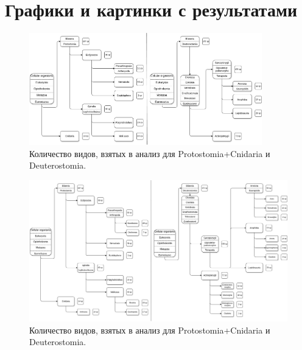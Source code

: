 \newpage
\section{Графики и картинки с результатами}

\begin{figure}[h] %
    \centering
    \includegraphics[width=0.9\textwidth]{images/Tree_summary}
    \caption{Количество видов, взятых в анализ для Protostomia+Cnidaria и Deuterostomia.}
    \label{fig:tree_1}
\end{figure}


\begin{figure}[h] %
    \centering
    \includegraphics[width=1.0\textwidth]{images/Tree_summary_v2}
    \caption{Количество видов, взятых в анализ для Protostomia+Cnidaria и Deuterostomia.}
    \label{fig:tree_2}
\end{figure}

